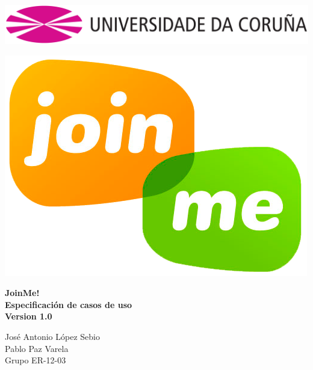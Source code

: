 \documentclass[12pt, a4paper, titlepage]{article}
\begin{document}

\begin{titlepage}

\includegraphics[width=15cm]{Imagenes/Simbolo_logo_UDC.png}

\vspace{3cm}

\begin{center}
\includegraphics[scale=0.3]{Imagenes/1a_Practica_ER_14-15.png}
\end{center}

\begin{flushright}
	\LARGE{\textbf{ JoinMe!}}\\
	\LARGE{\textbf{Especificación de casos de uso}}\\
	\large{\textbf{Version 1.0}}
	
		
\end{flushright}
\vspace{1cm}
\begin{center}
José Antonio López Sebio\\
Pablo Paz Varela\\
Grupo ER-12-03\\
\end{center}


\end{titlepage}
\end{document}
